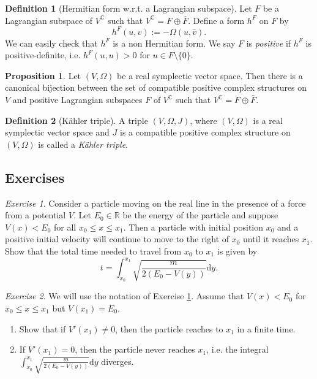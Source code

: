 \documentclass[11pt]{amsart}
\numberwithin{equation}{section}
\theoremstyle{plain}
\theoremstyle{definition}
\newtheorem{defn}{Definition}[subsection]
\newtheorem{prop}{Proposition}[subsection]
\theoremstyle{remark}
\newtheorem{exe}{Exercise}[subsection]
\newcommand{\R}{\mathbb{R}}
\newcommand{\dd}{{\mathrm{d}}}
\begin{document}
\begin{defn}[Hermitian form w.r.t. a Lagrangian subspace]
Let $F$ be a Lagrangian subspace of $V^\mathbb{C}$ such that $V^\mathbb{C}=F\oplus \bar F$. Define a form $h^F$ on $F$ by 
$$h^F(u,v):=-\Omega(u,\bar v).$$
We can easily check that $h^F$ is a non Hermitian form. We say $F$ is \emph{positive} if $h^F$ is positive-definite, i.e. $h^F(u,u)>0$ for $u\in F\setminus\{0\}$.
\end{defn}

\begin{prop}
Let $(V,\Omega)$ be a real symplectic vector space. Then there is a canonical bijection between the set of compatible positive complex structures on $V$ and positive Lagrangian subspaces $F$ of $V^\mathbb{C}$ such that $V^\mathbb{C}=F\oplus\bar F$.
\end{prop}

\begin{defn}[K\"ahler triple]
A triple $(V,\Omega,J)$, where $(V,\Omega)$ is a real symplectic vector space and $J$ is a compatible positive complex structure on $(V,\Omega)$ is called a \emph{K\"ahler triple}.
\end{defn}

\subsection{Exercises}

\begin{exe}
\label{problem1}
Consider a particle moving on the real line in the presence of a force from a potential $V$. Let $E_0\in\R$ be the energy of the particle and suppose $V(x)<E_0$ for all $x_0\leq x\leq x_1$. Then a particle with initial position $x_0$ and a positive initial velocity will continue to move to the right of $x_0$ until it reaches $x_1$. Show that the total time needed to travel from $x_0$ to $x_1$ is given by $$t=\int_{x_0}^{x_1}\sqrt{\frac{m}{2(E_0-V(y))}}\dd y.$$
\end{exe}

\begin{exe}
We will use the notation of Exercise \ref{problem1}. Assume that $V(x)<E_0$ for $x_0\leq x\leq x_1$ but $V(x_1)=E_0$.
\begin{enumerate}
\item{Show that if $V'(x_1)\not=0$, then the particle reaches to $x_1$ in a finite time.}
\item{If $V'(x_1)=0$, then the particle never reaches $x_1$, i.e. the integral $\int_{x_0}^{x_1}\sqrt{\frac{m}{2(E_0-V(y))}}\dd y$ diverges.
}
\end{enumerate}
\end{exe}
\end{document}

